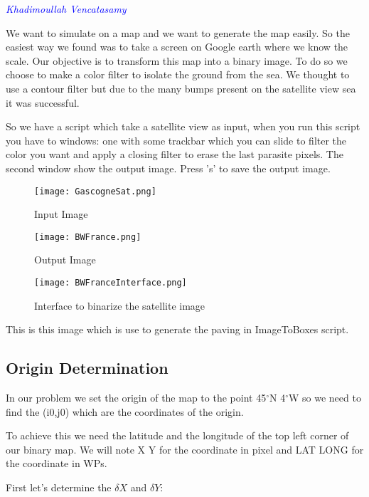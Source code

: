 
\textcolor{blue} {\textit{Khadimoullah Vencatasamy}}

We want to simulate on a map and we want to generate the map easily. So the easiest way we found was to take a screen on Google earth where we know the scale.
Our objective is to transform this map into a binary image. To do so we choose to make a color filter to isolate the ground from the sea. We thought to use a contour filter but due to the many bumps present on the satellite view sea it was successful.

So we have a script which take a satellite view as input, when you run this script you have to windows: one with some trackbar which you can slide to filter the color you want and apply a closing filter  to erase the last parasite pixels. The second window show the output image. Press 's' to save the output image.

\begin{figure}[H]
\centering
  \texttt{[image: GascogneSat.png]}
  \caption{Input Image}
\end{figure}

\begin{figure}[H]
\centering
  \texttt{[image: BWFrance.png]}
  \caption{Output Image}
\end{figure}


\begin{figure}[H]
\centering
  \texttt{[image: BWFranceInterface.png]}
  \caption{Interface to binarize the satellite image}
\end{figure}

This is this image which is use to generate the paving in ImageToBoxes script.

\subsection{Origin Determination}

In our problem we set the origin of the map to the point 45$^\circ$N 4$^\circ$W so we need to find the (i0,j0) which are the coordinates of the origin.

To achieve this we need the latitude and the longitude of the top left corner of our binary map.
We will note X Y for the coordinate in pixel and LAT LONG for the coordinate in WPs.

First let's determine the $\delta{X}$ and $\delta{Y}$:

